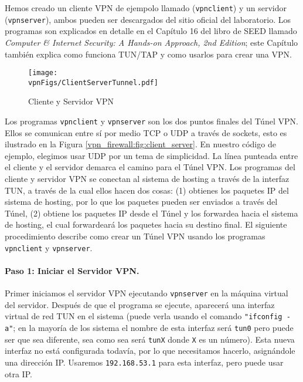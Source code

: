 Hemos creado un cliente VPN de ejempolo llamado (\texttt{vpnclient}) y un servidor  (\texttt{vpnserver}), ambos pueden ser descargados del sitio oficial del laboratorio.
Los programas son explicados en detalle en el Capítulo 16 del libro de SEED llamado \textit{Computer \& Internet Security: A Hands-on Approach, 2nd Edition}; este Capítulo también explica como funciona TUN/TAP y como usarlos para crear una VPN.


\begin{figure}[htb]
\begin{center}
\texttt{[image: \\vpnFigs/ClientServerTunnel.pdf]}
\end{center}
\caption{Cliente y Servidor VPN}
\label{vpn:fig:client_server}
\end{figure}

Los programas \texttt{vpnclient} y \texttt{vpnserver} son los dos puntos finales del Túnel VPN. Ellos se comunican entre sí por medio TCP o UDP a través de sockets, esto es ilustrado en la Figura \ref{vpn_firewall:fig:client_server}. En nuestro código de ejemplo, elegimos usar UDP por un tema de simplicidad. La línea punteada entre el cliente y el servidor demarca el camino para el Túnel VPN.
Los programas del cliente y servidor VPN se conectan al sistema de hosting a través de la interfaz TUN, a través de la cual ellos hacen dos cosas: (1) obtienes los paquetes IP del sistema de hosting, por lo que los paquetes pueden ser enviados a través del Túnel, (2) obtiene los paquetes IP desde el Túnel y los forwardea hacia el sistema de hosting, el cual forwardeará los paquetes hacia su destino final.
El siguiente procedimiento describe como crear un Túnel VPN usando los programas \texttt{vpnclient} y \texttt{vpnserver}.


\paragraph{Paso 1: Iniciar el Servidor VPN.} 
Primer iniciamos el servidor VPN ejecutando \texttt{vpnserver} en la máquina virtual del servidor.
Después de que el programa se ejecute, aparecerá una interfaz virtual de red TUN en el sistema (puede verla usando el comando \texttt{"ifconfig -a"}; en la mayoría de los sistema el nombre de esta interfaz será \texttt{tun0} pero puede ser que sea diferente, sea como sea será \texttt{tunX} donde \texttt{X} es un número).
Esta nueva interfaz no está configurada todavía, por lo que necesitamos hacerlo, asignándole una dirección IP. Usaremos \texttt{192.168.53.1} para esta interfaz, pero puede usar otra IP.

